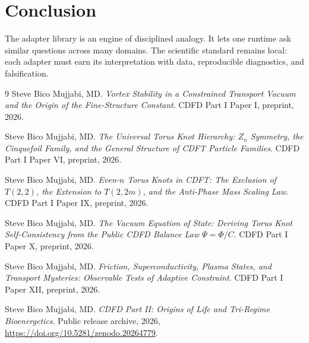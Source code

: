 \documentclass[12pt,a4paper]{article}
\begin{document}
\section{Conclusion}
The adapter library is an engine of disciplined analogy. It lets one runtime ask
similar questions across many domains. The scientific standard remains local:
each adapter must earn its interpretation with data, reproducible diagnostics,
and falsification.
\begin{thebibliography}{9}
Steve Bico Mujjabi, MD. \emph{Vortex Stability in a Constrained Transport Vacuum and the Origin of the Fine-Structure Constant}. CDFD Part I Paper I, preprint, 2026.

Steve Bico Mujjabi, MD. \emph{The Universal Torus Knot Hierarchy: $Z_n$ Symmetry, the Cinquefoil Family, and the General Structure of CDFT Particle Families}. CDFD Part I Paper VI, preprint, 2026.

Steve Bico Mujjabi, MD. \emph{Even-$n$ Torus Knots in CDFT: The Exclusion of $T(2,2)$, the Extension to $T(2,2m)$, and the Anti-Phase Mass Scaling Law}. CDFD Part I Paper IX, preprint, 2026.

Steve Bico Mujjabi, MD. \emph{The Vacuum Equation of State: Deriving Torus Knot Self-Consistency from the Public CDFD Balance Law $\Psi = \Phi/C$}. CDFD Part I Paper X, preprint, 2026.

Steve Bico Mujjabi, MD. \emph{Friction, Superconductivity, Plasma States, and Transport Mysteries: Observable Tests of Adaptive Constraint}. CDFD Part I Paper XII, preprint, 2026.

Steve Bico Mujjabi, MD. \emph{CDFD Part II: Origins of Life and Tri-Regime Bioenergetics}. Public release archive, 2026, \url{https://doi.org/10.5281/zenodo.20264779}.
\end{thebibliography}
\end{document}
